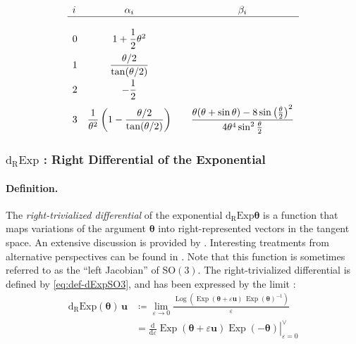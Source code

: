 \begin{equation}
\begin{array}{lccc}
i & \alpha_i & & \beta_i \\ \hline \\[0.1ex]
0 & 1 + \dfrac{1}{2}\theta^2
  &
  & %
\\[0.3cm]
1 & \dfrac{\theta / 2}{\tan (\theta / 2)}
  &
  & 
\\[0.3cm] 
2 & -\dfrac{1}{2}
  &
  & %
\\[0.3cm]
3 & \dfrac{1}{\theta^2}\left(1 - \dfrac{\theta / 2}{\tan (\theta / 2)}\right) 
  & %
  & \dfrac{\theta (\theta+\sin\theta) -8 \sin \left(\frac{\theta}{2}\right)^2}{4 \theta^4 \sin^2\frac{\theta}{2}}
\\[0.3cm]
\end{array}
\label{eq:ber}
\end{equation}

\hypertarget{sec:drExpSO3}{%
\subsubsection{\texorpdfstring{\(\operatorname{d_{\scriptscriptstyle{R}}Exp}\)
: Right Differential of the Exponential}{drExp : Right Differential of the Exponential}}\label{sec:drExpSO3}}
%

\paragraph*{Definition.}
%
The \emph{right-trivialized differential} of the exponential \(\operatorname{d_{\scriptscriptstyle{R}}Exp} {\bm{\theta}}\) is a function that 
maps variations of the argument \(\bm{\theta}\)
into right-represented vectors in the tangent space. An extensive discussion is
provided by \cite{ibrahimbegović1995computational}. Interesting
treatments from alternative perspectives can be found in
\cite{pietraszkiewicz1983finite,simo1986threedimensional,pfister1998bernoulli}. Note that this function is sometimes referred to as the ``left Jacobian'' of \(\mathrm{SO}(3)\).
%
The right-trivialized differential is defined by \eqref{eq:def-dExpSO3}, 
and has been expressed by the limit \citep{sola2018lie}:
%
\begin{equation*} 
\begin{aligned}
\operatorname{d_{\scriptscriptstyle{R}}Exp}({\bm{\theta}})\,
\bm{u}
&\coloneq \lim _{\varepsilon \rightarrow 0} \frac{\operatorname{Log} \left(\operatorname{Exp}(\bm{\theta} + \varepsilon\bm{u}) \, \operatorname{Exp}(\bm{\theta})^{-1}\right)}{\varepsilon} \\
& =\left.\frac{\mathrm{d}}{\mathrm{d} \varepsilon}\operatorname{Exp} (\bm{\theta}+\varepsilon  \bm{u}) \operatorname{Exp} (-{\bm{\theta}})\right|_{\varepsilon=0}^{\vee}
\end{aligned}
\end{equation*}
 
